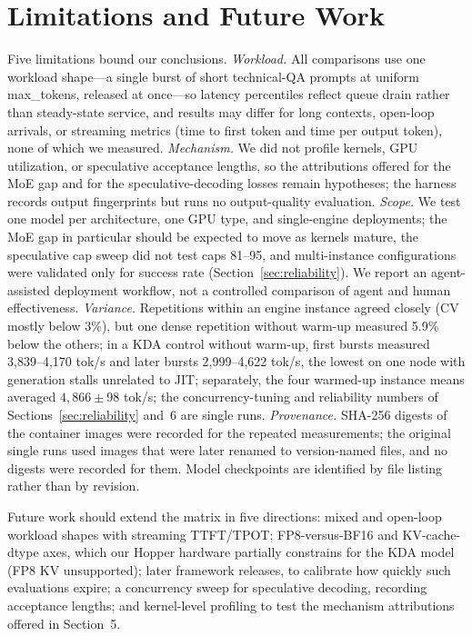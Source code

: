 \documentclass[11pt]{article}
\newcommand{\tps}{tok/s\xspace}
\begin{document}
\section{Limitations and Future Work}

Five limitations bound our conclusions. \emph{Workload.} All comparisons use one workload shape---a single burst of short technical-QA prompts at uniform max\_tokens, released at once---so latency percentiles reflect queue drain rather than steady-state service, and results may differ for long contexts, open-loop arrivals, or streaming metrics (time to first token and time per output token), none of which we measured. \emph{Mechanism.} We did not profile kernels, GPU utilization, or speculative acceptance lengths, so the attributions offered for the MoE gap and for the speculative-decoding losses remain hypotheses; the harness records output fingerprints but runs no output-quality evaluation. \emph{Scope.} We test one model per architecture, one GPU type, and single-engine deployments; the MoE gap in particular should be expected to move as kernels mature, the speculative cap sweep did not test caps 81--95, and multi-instance configurations were validated only for success rate (Section~\ref{sec:reliability}). We report an agent-assisted deployment workflow, not a controlled comparison of agent and human effectiveness. \emph{Variance.} Repetitions within an engine instance agreed closely (CV mostly below 3\%), but one dense repetition without warm-up measured 5.9\% below the others; in a KDA control without warm-up, first bursts measured 3,839--4,170 \tps{} and later bursts 2,999--4,622 \tps, the lowest on one node with generation stalls unrelated to JIT; separately, the four warmed-up instance means averaged $4{,}866 \pm 98$ \tps; the concurrency-tuning and reliability numbers of Sections~\ref{sec:reliability} and~6 are single runs. \emph{Provenance.} SHA-256 digests of the container images were recorded for the repeated measurements; the original single runs used images that were later renamed to version-named files, and no digests were recorded for them. Model checkpoints are identified by file listing rather than by revision.

Future work should extend the matrix in five directions: mixed and open-loop workload shapes with streaming TTFT/TPOT; FP8-versus-BF16 and KV-cache-dtype axes, which our Hopper hardware partially constrains for the KDA model (FP8 KV unsupported); later framework releases, to calibrate how quickly such evaluations expire; a concurrency sweep for speculative decoding, recording acceptance lengths; and kernel-level profiling to test the mechanism attributions offered in Section~5.
\end{document}
